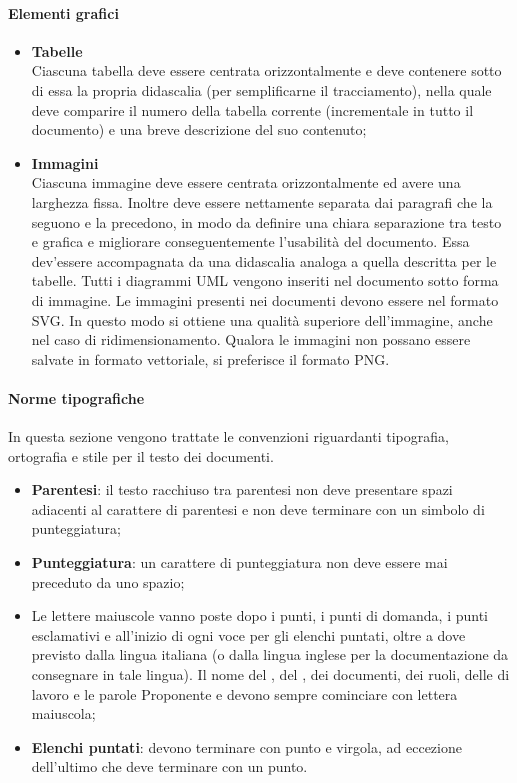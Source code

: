 \paragraph*{Elementi grafici}
\begin{itemize}
	\item \textbf{Tabelle} \\
		Ciascuna tabella deve essere centrata orizzontalmente e deve contenere sotto di essa la propria
		didascalia (per semplificarne il tracciamento), nella quale deve comparire il numero della tabella corrente (incrementale in tutto
		il documento) e una breve descrizione del suo contenuto;
	\item \textbf{Immagini} \\
		Ciascuna immagine deve essere centrata orizzontalmente ed avere una larghezza fissa. Inoltre deve
		essere nettamente separata dai paragrafi che la seguono e la precedono, in modo da definire una
		chiara separazione tra testo e grafica e migliorare conseguentemente l'usabilità del documento. Essa dev’essere
		accompagnata da una didascalia analoga a quella descritta per le tabelle. Tutti i diagrammi
		UML vengono inseriti nel documento sotto forma di immagine.
	        Le immagini presenti nei documenti devono essere nel formato SVG.
		In questo modo si ottiene una qualità superiore dell'immagine, anche nel caso di ridimensionamento. 
		Qualora le immagini non possano essere salvate in formato vettoriale, si preferisce il formato PNG.

\end{itemize}

\paragraph*{Norme tipografiche}
In questa sezione vengono trattate le convenzioni riguardanti tipografia, ortografia e stile per il testo dei documenti. 
\begin{itemize}
\item \textbf{Parentesi}: il testo racchiuso tra parentesi non deve presentare spazi adiacenti al carattere di parentesi e non deve terminare con un simbolo di punteggiatura;
\item \textbf{Punteggiatura}: un carattere di punteggiatura non deve essere mai preceduto da uno spazio;
\item Le lettere maiuscole vanno poste dopo i punti, i punti di domanda, i punti esclamativi e all'inizio di ogni voce per gli elenchi puntati, oltre a dove previsto dalla lingua italiana (o dalla lingua inglese per la documentazione da consegnare in tale lingua). Il nome del , del , dei documenti, dei ruoli, delle  di lavoro e le parole Proponente e  devono sempre cominciare con lettera maiuscola;
  \item \textbf{Elenchi puntati}: devono terminare con punto e virgola, ad eccezione dell'ultimo che deve terminare con un punto.
\end{itemize}

